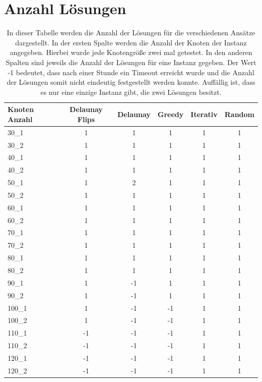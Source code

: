 \section{Anzahl Lösungen}
\begin{table}[H]
\centering
\begin{tabular}{|l|c|c|c|c|c|}
\hline
Knoten Anzahl & Delaunay Flips & Delaunay & Greedy & Iterativ & Random \\
\hline
30\_1 & 1 & 1 & 1 & 1 & 1 \\
30\_2 & 1 & 1 & 1 & 1 & 1 \\
40\_1 & 1 & 1 & 1 & 1 & 1 \\
40\_2 & 1 & 1 & 1 & 1 & 1 \\
50\_1 & 1 & 2 & 1 & 1 & 1 \\
50\_2 & 1 & 1 & 1 & 1 & 1 \\
60\_1 & 1 & 1 & 1 & 1 & 1 \\
60\_2 & 1 & 1 & 1 & 1 & 1 \\
70\_1 & 1 & 1 & 1 & 1 & 1 \\
70\_2 & 1 & 1 & 1 & 1 & 1 \\
80\_1 & 1 & 1 & 1 & 1 & 1 \\
80\_2 & 1 & 1 & 1 & 1 & 1 \\
90\_1 & 1 & -1 & 1 & 1 & 1 \\
90\_2 & 1 & -1 & 1 & 1 & 1 \\
100\_1 & 1 & -1 & -1 & 1 & 1 \\
100\_2 & 1 & -1 & -1 & 1 & 1 \\
110\_1 & -1 & -1 & -1 & 1 & 1 \\
110\_2 & -1 & -1 & -1 & 1 & 1 \\
120\_1 & -1 & -1 & -1 & 1 & 1 \\
120\_2 & -1 & -1 & -1 & 1 & 1 \\
\hline
\end{tabular}
\caption[Anzahl der Lösungen pro Instanz.]{In dieser Tabelle werden die Anzahl der Lösungen für die verschiedenen Ansätze dargestellt.
In der ersten Spalte werden die Anzahl der Knoten der Instanz angegeben.
Hierbei wurde jede Knotengröße zwei mal getestet.
In den anderen Spalten sind jeweils die Anzahl der Lösungen für eine Instanz gegeben.
Der Wert -1 bedeutet, dass nach einer Stunde ein Timeout erreicht wurde und die Anzahl der Lösungen somit nicht eindeutig festgestellt werden konnte.
Auffällig ist, dass es nur eine einzige Instanz gibt, die zwei Lösungen besitzt.}
\label{tab:triangulation_results}
\end{table}






